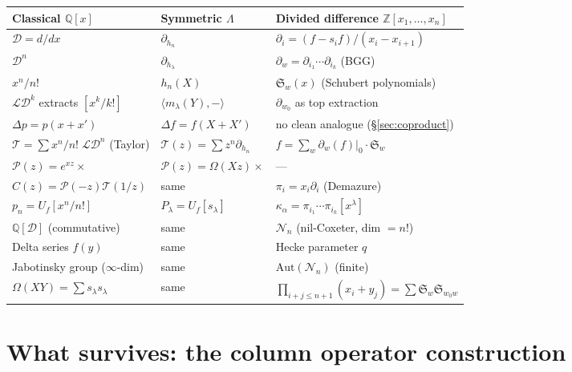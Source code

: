 \documentclass[11pt]{amsart}
\theoremstyle{definition}
\newcommand{\Z}{\mathbb{Z}}
\newcommand{\Q}{\mathbb{Q}}
\newcommand{\cL}{\mathcal{L}}
\newcommand{\cD}{\mathcal{D}}
\newcommand{\cT}{\mathcal{T}}
\newcommand{\cP}{\mathcal{P}}
\newcommand{\cN}{\mathcal{N}}
\begin{document}
\medskip
\begin{center}
\renewcommand{\arraystretch}{1.4}
\begin{tabular}{>{\raggedright}p{3.2cm} >{\raggedright}p{4cm}
  >{\raggedright\arraybackslash}p{4.8cm}}
\toprule
\textbf{Classical} $\Q[x]$ &
\textbf{Symmetric} $\Lambda$ &
\textbf{Divided difference} $\Z[x_1,\dots,x_n]$ \\
\midrule
$\cD = d/dx$ &
$\partial_{h_n}$ &
$\partial_i = (f - s_i f)/(x_i - x_{i+1})$ \\[4pt]
$\cD^n$ &
$\partial_{h_\lambda}$ &
$\partial_w = \partial_{i_1} \cdots \partial_{i_k}$ (BGG) \\[4pt]
$x^n / n!$ &
$h_n(X)$ &
$\mathfrak{S}_w(x)$ (Schubert polynomials) \\[4pt]
$\cL \cD^k$ extracts $[x^k/k!]$ &
$\langle m_\lambda(Y), -\rangle$ &
$\partial_{w_0}$ as top extraction \\[4pt]
$\Delta p = p(x + x')$ &
$\Delta f = f(X + X')$ &
no clean analogue (\S\ref{sec:coproduct}) \\[4pt]
$\cT = \sum x^n/n!\; \cL \cD^n$ (Taylor) &
$\cT(z) = \sum z^n \partial_{h_n}$ &
$f = \sum_w \partial_w(f)|_0 \cdot \mathfrak{S}_w$ \\[4pt]
$\cP(z) = e^{xz} \times$ &
$\cP(z) = \Omega(Xz) \times$ &
--- \\[4pt]
$C(z) = \cP(-z)\cT(1/z)$ &
same &
$\pi_i = x_i \partial_i$ (Demazure) \\[4pt]
$p_n = U_f[x^n/n!]$ &
$P_\lambda = U_f[s_\lambda]$ &
$\kappa_\alpha = \pi_{i_1} \cdots \pi_{i_k}[x^\lambda]$ \\[4pt]
$\Q[\cD]$ (commutative) &
same &
$\cN_n$ (nil-Coxeter, dim $= n!$) \\[4pt]
Delta series $f(y)$ &
same &
Hecke parameter $q$ \\[4pt]
Jabotinsky group ($\infty$-dim) &
same &
$\mathrm{Aut}(\cN_n)$ (finite) \\[4pt]
$\Omega(XY) = \sum s_\lambda s_\lambda$ &
same &
$\prod_{i+j \leq n+1}(x_i + y_j) = \sum \mathfrak{S}_w \mathfrak{S}_{w_0 w}$ \\
\bottomrule
\end{tabular}
\end{center}

\section{What survives: the column operator construction}
\end{document}

